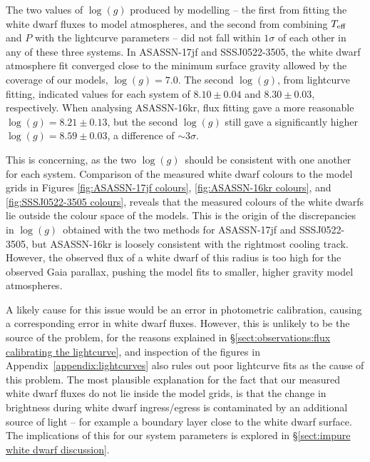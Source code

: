 The two values of $\log (g)$ produced by modelling -- the first from fitting the white dwarf fluxes to model atmospheres, and the second from combining $T_{\rm eff}$ and $P$ with the lightcurve parameters -- did not fall within $1\sigma$ of each other in any of these three systems.
In ASASSN-17jf and SSSJ0522-3505, the white dwarf atmosphere fit converged close to the minimum surface gravity allowed by the coverage of our models, $\log(g) = 7.0$.
The second $\log (g)$, from lightcurve fitting, indicated values for each system of $8.10\pm0.04$ and $8.30\pm0.03$, respectively.
When analysing ASASSN-16kr, flux fitting gave a more reasonable $\log(g)=8.21\pm0.13$, but the second $\log (g)$ still gave a significantly higher $\log(g)=8.59\pm0.03$, a difference of $\sim3\sigma$.

This is concerning, as the two $\log (g)$\ should be consistent with one another for each system.
Comparison of the measured white dwarf colours to the \citet{Bergeron1995} model grids in Figures \ref{fig:ASASSN-17jf colours}, \ref{fig:ASASSN-16kr colours}, and \ref{fig:SSSJ0522-3505 colours}, reveals that the measured colours of the white dwarfs lie outside the colour space of the models. This is the origin of the discrepancies in $\log (g)$\ obtained with the two methods for ASASSN-17jf and SSSJ0522-3505, but ASASSN-16kr is loosely consistent with the rightmost cooling track. However, the observed flux of a white dwarf of this radius is too high for the observed Gaia parallax, pushing the model fits to smaller, higher gravity model atmospheres.

A likely cause for this issue would be an error in photometric calibration, causing a corresponding error in white dwarf fluxes. However, this is unlikely to be the source of the problem, for the reasons explained in \S\ref{sect:observations:flux calibrating the lightcurve}, and inspection of the figures in Appendix~\ref{appendix:lightcurves} also rules out poor lightcurve fits as the cause of this problem.
The most plausible explanation for the fact that our measured white dwarf fluxes do not lie inside the model grids, is that the change in brightness during white dwarf ingress/egress is contaminated by an additional source of light -- for example a boundary layer close to the white dwarf surface. The implications of this for our system parameters is explored in \S\ref{sect:impure white dwarf discussion}.


